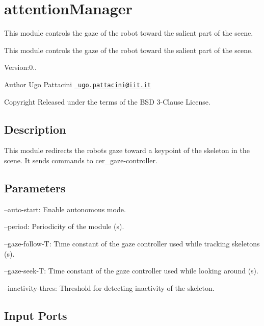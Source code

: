 \section{attention\+Manager}
\label{group__attentionManager}


This module controls the gaze of the robot toward the salient part of the scene.  


This module controls the gaze of the robot toward the salient part of the scene. 

Version\+:0.. \begin{DoxyAuthor}{Author}
Ugo Pattacini \href{mailto:ugo.pattacini@iit.it}{\texttt{ ugo.\+pattacini@iit.\+it}} ~\newline
 
\end{DoxyAuthor}
\begin{DoxyCopyright}{Copyright}
Released under the terms of the B\+SD 3-\/Clause License. 
\end{DoxyCopyright}
\hypertarget{group__skeletonViewer_intro_sec}{}\subsection{Description}\label{group__skeletonViewer_intro_sec}
This module redirects the robot\textquotesingle{}s gaze toward a keypoint of the skeleton in the scene. It sends commands to cer\+\_\+gaze-\/controller.\hypertarget{group__skeletonViewer_parameters_sec}{}\subsection{Parameters}\label{group__skeletonViewer_parameters_sec}

\begin{DoxyItemize}
\item --auto-\/start\+: Enable autonomous mode.
\item --period\+: Periodicity of the module (s).
\item --gaze-\/follow-\/T\+: Time constant of the gaze controller used while tracking skeletons (s).
\item --gaze-\/seek-\/T\+: Time constant of the gaze controller used while looking around (s).
\item --inactivity-\/thres\+: Threshold for detecting inactivity of the skeleton. 
\end{DoxyItemize}\hypertarget{group__skeletonViewer_inputports_sec}{}\subsection{Input Ports}\label{group__skeletonViewer_inputports_sec}

